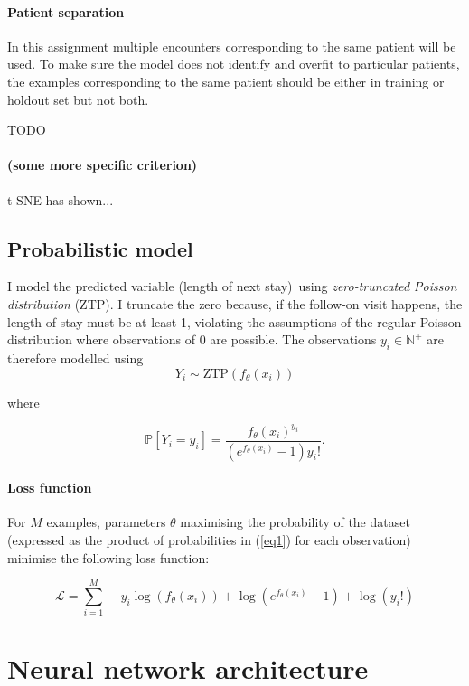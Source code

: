 \documentclass[10pt, twocolumn]{article}
\begin{document}
\paragraph{Patient separation} In this assignment multiple encounters corresponding to the same patient will be used. To make sure the model does not identify and overfit to particular patients, the examples corresponding to the same patient should be either in training or holdout set but not both.

TODO \paragraph{(some more specific criterion)} t-SNE has shown...


\subsection{Probabilistic model}

I model the predicted variable (length of next stay) using \textit{zero-truncated Poisson distribution} (ZTP). I truncate the zero because, if the follow-on visit happens, the length of stay must be at least 1, violating the assumptions of the regular Poisson distribution where observations of 0 are possible. The observations $y_i \in \mathbb{N}^+$ are therefore modelled using \[Y_i \sim \mathrm{ZTP}(f_\theta(x_i))\]

where 

\begin{equation}
	\mathbb{P}[Y_i = y_i] = \frac{f_\theta(x_i)^{y_i}}{(e^{f_\theta(x_i)} - 1)y_i!}.
	\label{eq1}
\end{equation}

\paragraph{Loss function} For $M$ examples, parameters $\theta$ maximising the probability of the dataset (expressed as the product of probabilities in (\ref{eq1}) for each observation) minimise the following loss function:

\begin{equation}
	\mathcal{L} = \sum\limits_{i=1}^{M} -y_i \log(f_\theta(x_i)) + \log(e^{f_\theta(x_i)} - 1) + \log(y_i!)
\end{equation}



\section{Neural network architecture}
\end{document}
